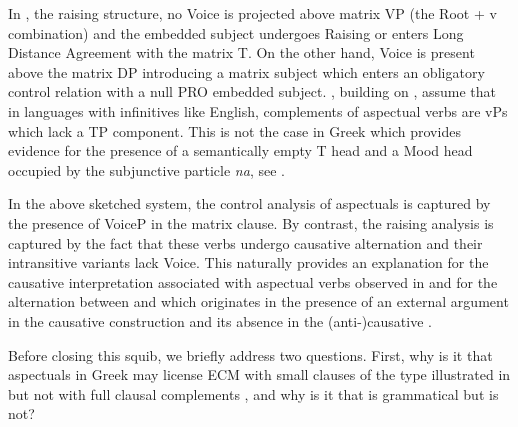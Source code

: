 \documentclass[output=paper]{langscibook}
\begin{document}
In , the raising structure, no Voice is projected above matrix VP (the Root + v combination) 
and the embedded subject undergoes Raising or enters Long Distance Agreement with the matrix T. 
On the other hand, Voice is present above the matrix DP introducing a matrix subject which enters an obligatory control relation with a null PRO embedded subject. 
\citet{MourounasWilliamson2019}, building on \citet{wurmbrand2001,Wurmbrand2002,Wurmbrand2014}, assume that in languages with infinitives like English, complements of aspectual verbs are vPs which lack a TP component. 
This is not the case in Greek which provides evidence for the presence of a semantically empty T head 
and a Mood head occupied by the subjunctive particle \textit{na}, see \citet{AlexiadouAnagnostopoulouToapp}. 

In the above sketched system, the control analysis of aspectuals is captured by the presence of VoiceP in the matrix clause. 
By contrast, the raising analysis is captured by the fact that these verbs undergo causative alternation and their intransitive variants lack Voice. 
This naturally provides an explanation for the causative interpretation associated with aspectual verbs observed in  
and for the alternation between  and  
which originates in the presence of an external argument in the causative construction  
and its absence in the (anti-)causative . 

Before closing this squib, we briefly address two questions. 
First, why is it that aspectuals in Greek may license ECM with small clauses of the type illustrated in  
but not with full clausal complements , and why is it that  is grammatical but  is not?

\ea%
    \label{alexiadouex:key:19}
    \z
\z 
\end{document}
